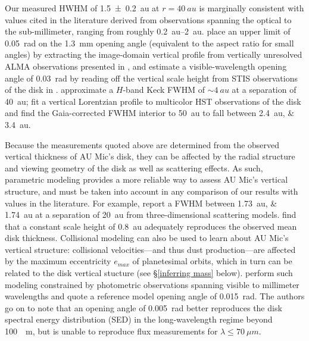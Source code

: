 \documentclass[modern]{aastex62}
\begin{document}
Our measured HWHM of \SI{1.5 \pm 0.2}{au} at $r=\SI{40}{au}$ is marginally consistent with values cited in the literature derived from observations spanning the optical to the sub-millimeter, ranging from roughly \SIrange{0.2}{2}{au}.
\citet{schuppler17} place an upper limit of \SI{0.05}{\radian} on the \SI{1.3}{mm} opening angle (equivalent to the aspect ratio for small angles) by extracting the image-domain vertical profile from vertically unresolved ALMA observations presented in \citet{macgregor13}, and estimate a visible-wavelength opening angle of \SI{0.03}{\radian} by reading off the vertical scale height from STIS observations of the disk in \citet{schneider14}.
\citet{metchev05} approximate a $H$-band Keck FWHM of $\sim \SI{4}{au}$ at a separation of \SI{40}{au};
\citet{krist05} fit a vertical Lorentzian profile to multicolor HST observations of the disk and find the Gaia-corrected FWHM interior to \SI{50}{au} to fall between \SIlist{2.4;3.4}{au}.

Because the measurements quoted above are determined from the observed vertical thickness of AU Mic's disk, they can be affected by the radial structure and viewing geometry of the disk as well as scattering effects. 
As such, parametric modeling provides a more reliable way to assess AU Mic's vertical structure, and must be taken into account in any comparison of our results with values in the literature.  
For example, \citet{krist05} report a FWHM between \SIlist{1.73;1.74}{au} at a separation of \SI{20}{au} from three-dimensional scattering models.
\citet{metchev05} find that a constant scale height of \SI{0.8}{au} adequately reproduces the observed mean disk thickness.
Collisional modeling can also be used to learn about AU Mic's vertical structure: collisional velocities---and thus dust production---are affected by the maximum eccentricity $e_{max}$ of planetesimal orbits, which in turn can be related to the disk vertical stucture (see \S \ref{inferring mass} below). 
\citet{schuppler17} perform such modeling constrained by photometric observations spanning visible to millimeter wavelengths and quote a reference model opening angle of \SI{0.015}{rad}.
The authors go on to note that an opening angle of \SI{0.005}{rad} better reproduces the disk spectral energy distribution (SED) in the long-wavelength regime beyond \SI{100}{\mu m}, but is unable to reproduce flux measurements for $\lambda \leq \SI{70}{\mu m}$.
\end{document}
